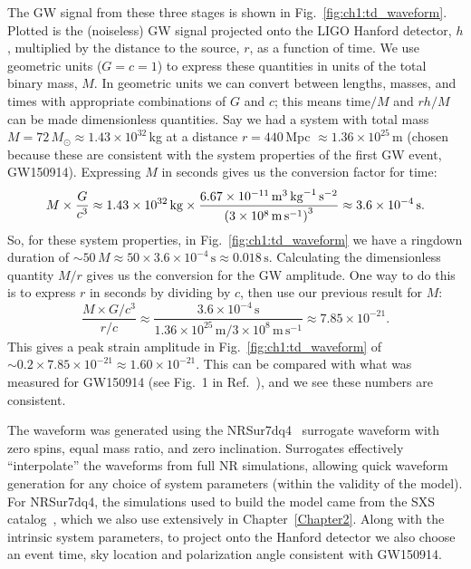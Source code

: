The GW signal from these three stages is shown in Fig.~\ref{fig:ch1:td_waveform}.
Plotted is the (noiseless) GW signal projected onto the LIGO Hanford detector, $h$, multiplied by the distance to the source, $r$, as a function of time. 
We use geometric units ($G = c = 1$) to express these quantities in units of the total binary mass, $M$. 
In geometric units we can convert between lengths, masses, and times with appropriate combinations of $G$ and $c$; this means $\mathrm{time}/M$ and $rh/M$ can be made dimensionless quantities. 
Say we had a system with total mass $M = 72\, M_\odot \approx 1.43 \times 10^{32}\,$kg at a distance $r = 440\,$Mpc $\approx 1.36 \times 10^{25}\,$m (chosen because these are consistent with the system properties of the first GW event, GW150914). 
Expressing $M$ in seconds gives us the conversion factor for time:
\begin{equation}
    M \times \frac{G}{c^3} \approx 1.43 \times 10^{32}\, \mathrm{kg} \times \frac{6.67 \times 10^{-11}\, \mathrm{m}^3\, \mathrm{kg}^{-1}\, \mathrm{s}^{-2}}{\qty(3 \times 10^8\, \mathrm{m}\, \mathrm{s}^{-1})^3} \approx 3.6 \times 10^{-4}\, \mathrm{s}.
\end{equation}
So, for these system properties, in Fig.~\ref{fig:ch1:td_waveform} we have a ringdown duration of $\sim 50\, M \approx 50 \times 3.6 \times 10^{-4}\, \mathrm{s} \approx 0.018\, \mathrm{s}$. 
Calculating the dimensionless quantity $M/r$ gives us the conversion for the GW amplitude. 
One way to do this is to express $r$ in seconds by dividing by $c$, then use our previous result for $M$:
\begin{equation}
    \frac{M \times G/c^3}{r/c} \approx \frac{3.6 \times 10^{-4}\, \mathrm{s}}{1.36 \times 10^{25}\, \mathrm{m}/3 \times 10^8\, \mathrm{m}\, \mathrm{s}^{-1}} \approx 7.85 \times 10^{-21}.
\end{equation}
This gives a peak strain amplitude in Fig.~\ref{fig:ch1:td_waveform} of $\sim 0.2 \times 7.85 \times 10^{-21} \approx 1.60 \times 10^{-21}$. 
This can be compared with what was measured for GW150914 (see Fig.~1 in Ref.~\cite{LIGOScientific:2016aoc}), and we see these numbers are consistent.

The waveform was generated using the NRSur7dq4~\cite{Varma:2019csw} surrogate waveform with zero spins, equal mass ratio, and zero inclination. 
Surrogates effectively ``interpolate'' the waveforms from full NR simulations, allowing quick waveform generation for any choice of system parameters (within the validity of the model). 
For NRSur7dq4, the simulations used to build the model came from the SXS catalog~\cite{sxs_catalog}, which we also use extensively in Chapter~\ref{Chapter2}. 
Along with the intrinsic system parameters, to project onto the Hanford detector we also choose an event time, sky location and polarization angle consistent with GW150914. 

